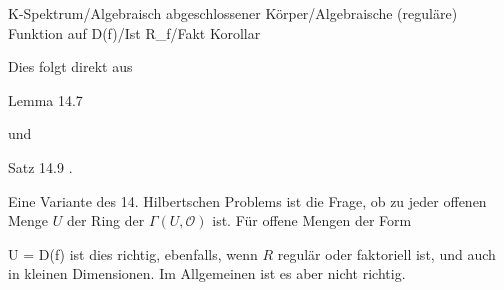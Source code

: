 {K-Spektrum/Algebraisch abgeschlossener Körper/Algebraische (reguläre) Funktion auf D(f)/Ist R_f/Fakt}
{Korollar}
{}
{



\faktsituation {}
\faktzusatz {}
\faktzusatz {}





}
{





Dies folgt direkt aus

Lemma 14.7

und

Satz 14.9
.




}


{}
{





Eine Variante des 14. Hilbertschen Problems ist die Frage, ob zu jeder offenen Menge $U$ der Ring der
$\Gamma ( U , {\mathcal O} )$
ist. Für offene Mengen der Form

\mavergleichskette
{\vergleichskette
{U
}
{ = }{ D(f)
}
{  }{
}
{    }{
}
{   }{
}
}
{}{}{}
ist dies richtig, ebenfalls, wenn $R$ regulär oder faktoriell ist, und auch in kleinen Dimensionen. Im Allgemeinen ist es aber nicht richtig.





}
